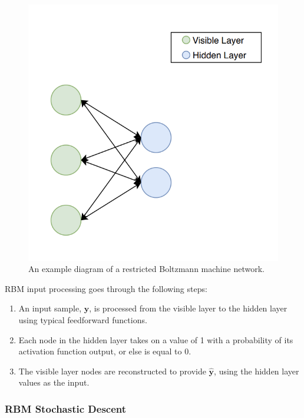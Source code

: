 \documentclass[a4paper,11pt,oneside]{article}
\theoremstyle{plain}
\theoremstyle{definition}
\begin{document}
	\begin{figure}[H]
		\centering 
		\includegraphics[scale=0.5]{images/implementation/rbm_network_diagram.png}
		\caption[Restricted Boltzmann Machines Diagram]{An example diagram of a restricted Boltzmann machine network.}
		\label{figure-rbm_network_diagram}
	\end{figure}		
	
	RBM input processing goes through the following steps:
	
	\begin{enumerate}
		\item An input sample, $\mathbf{y}$, is processed from the visible layer to the hidden layer using typical feedforward functions.
		\item Each node in the hidden layer takes on a value of 1 with a probability of its activation function output, or else is equal to 0.
		\item The visible layer nodes are reconstructed to provide $\mathbf{\hat{y}}$, using the hidden layer values as the input.
	\end{enumerate}
	
	\subsubsection{RBM Stochastic Descent}
	
\end{document}
